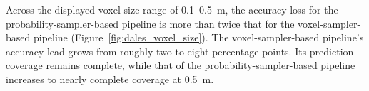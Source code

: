Across the displayed voxel-size range of 0.1--0.5~m, the accuracy loss for the probability-sampler-based pipeline is more than twice that for the voxel-sampler-based pipeline (Figure~\ref{fig:dales_voxel_size}). The voxel-sampler-based pipeline's accuracy lead grows from roughly two to eight percentage points. Its prediction coverage remains complete, while that of the probability-sampler-based pipeline increases to nearly complete coverage at 0.5~m.
